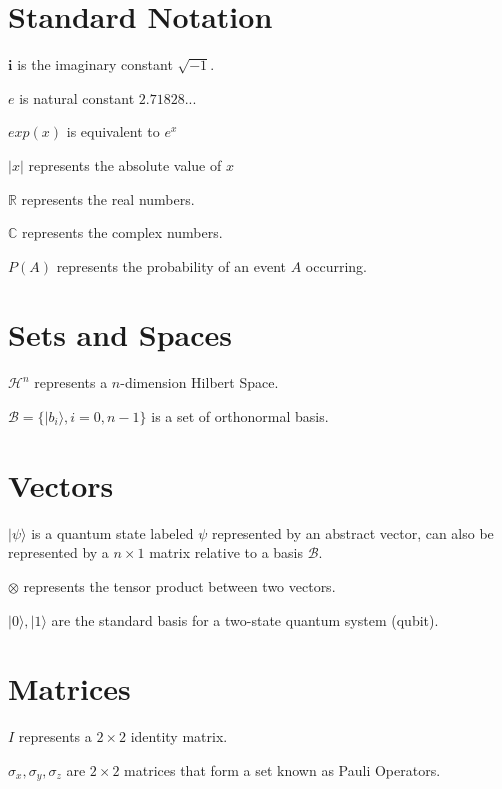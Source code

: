 

\listofsymbols

\section{Standard Notation}

$\mathbf{i}$ is the imaginary constant $\sqrt{-1}$.

$e$ is natural constant $2.71828...$

$exp(x)$ is equivalent to $e^{x}$

$\vert x \vert $ represents the absolute value of $x$

$\mathbb{R}$ represents the real numbers.

$\mathbb{C}$ represents the complex numbers.

$P(A)$ represents the probability of an event $A$ occurring.

\section{Sets and Spaces}

$\mathcal{H}^{n}$ represents a $n$-dimension Hilbert Space.

$\mathcal{B} = \{ \vert b_{i} \rangle, i=0, n-1\}$ is a set of orthonormal basis.

\section{Vectors}

$\vert \psi \rangle$ is a quantum state labeled $\psi$ represented by an abstract vector, can also be represented by a $n \times 1$ matrix relative to a basis $\mathcal{B}$.

$\otimes$ represents the tensor product between two vectors.

$ \vert 0 \rangle , \vert 1 \rangle$ are the standard basis for a two-state quantum system (qubit).

\section{Matrices}

$I$ represents a $2 \times 2$ identity matrix.

$\sigma_{x}, \sigma_{y}, \sigma_{z}$ are $2 \times 2$ matrices that form a set known as Pauli Operators.


